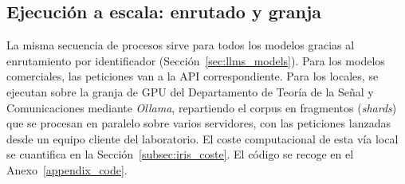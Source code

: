 \subsection{Ejecución a escala: enrutado y granja}

La misma secuencia de procesos sirve para todos los modelos gracias al enrutamiento por
identificador (Sección~\ref{sec:llms_models}). Para los modelos comerciales,
las peticiones van a la API correspondiente. Para los locales, se ejecutan sobre
la granja de GPU del Departamento de Teoría de la Señal y Comunicaciones mediante
\textit{Ollama}, repartiendo el corpus en fragmentos (\textit{shards}) que se procesan
en paralelo sobre varios servidores, con las peticiones lanzadas desde un equipo
cliente del laboratorio. El coste computacional de esta vía local se cuantifica en
la Sección~\ref{subsec:iris_coste}. El código se recoge en el
Anexo~\ref{appendix_code}.
